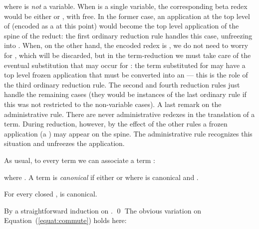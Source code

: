 \documentclass{LMCS}
\begin{document}
where  is \emph{not} a variable. When  is a single variable, 
the corresponding beta redex would be either  or 
, with  free. In the former case, an application at the top
level of  (encoded as a  at this point) would become the top level
application of the spine of the reduct: the first ordinary reduction rule handles this case, unfreezing
 into  . When, on the other hand, the encoded redex is 
, we do not need to worry for , which will be discarded,
but in the term-reduction we must take care of the eventual substitution that may occur for
: the term substituted for  may have a top level frozen application  that must be
converted into an  --- this is the role of the third ordinary reduction rule. 
The second and fourth reduction rules just handle the remaining cases (they would be
instances of the last ordinary rule if this was not restricted to the non-variable cases).
A last remark on the administrative rule. There are never administrative redexes in the translation  of a term. During reduction, however, by the effect of the other rules a frozen application (a )
    may appear on the spine. The administrative rule recognizes this situation and unfreezes the application.

As usual, to every term  we can associate a term :

where .
A term  is \emph{canonical} if either  or
 where  is canonical and .
\begin{lem}\label{lemma:closedcanonical}
For every closed ,  is canonical.
\end{lem}
\proof
By a straightforward induction on .
\qed
The obvious variation on Equation~(\ref{equat:commute}) holds here:
\end{document}
